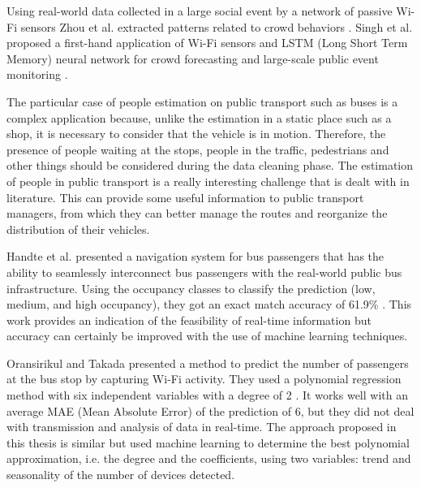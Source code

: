 Using real-world data collected in a large social event by a network of passive Wi-Fi sensors Zhou et al. extracted patterns related to crowd behaviors \cite{zhou2020understanding}.
Singh et al. proposed a first-hand application of Wi-Fi sensors and LSTM (Long Short Term Memory) neural network for crowd forecasting and large-scale public event monitoring \cite{singh2020crowd}.

The particular case of people estimation on public transport such as buses is a complex application because, unlike the estimation in a static place such as a shop, it is necessary to consider that the vehicle is in motion. Therefore, the presence of people waiting at the stops, people in the traffic, pedestrians and other things should be considered during the data cleaning phase. The estimation of people in public transport is a really interesting challenge that is dealt with in literature. This can provide some useful information to public transport managers, from which they can better manage the routes and reorganize the distribution of their vehicles.

Handte et al. presented a navigation system for bus passengers that has the ability to seamlessly interconnect bus passengers with the real-world public bus infrastructure. Using the occupancy classes to classify the prediction (low, medium, and high occupancy), they got an exact match accuracy of 61.9\% \cite{handte2016internet}. This work provides an indication of the feasibility of real-time information but accuracy can certainly be improved with the use of machine learning techniques.

Oransirikul and Takada presented a method to predict the number of passengers at the bus stop by capturing Wi-Fi activity. They used a polynomial regression method with six independent variables with a degree of 2 \cite{oransirikul2019practicability}. It works well with an average MAE (Mean Absolute Error) of the prediction of 6, but they did not deal with transmission and analysis of data in real-time.
The approach proposed in this thesis is similar but used machine learning to determine the best polynomial approximation, i.e. the degree and the coefficients, using two variables: trend and seasonality of the number of devices detected.
